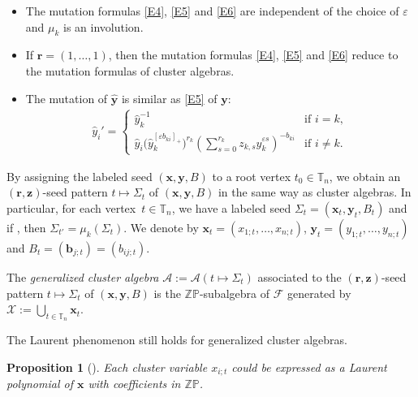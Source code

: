 \documentclass[pdftex]{sigma}
\newcommand{\Z}{\mathbb{Z}}
\numberwithin{equation}{section}
\newtheorem{Proposition}[Theorem]{Proposition}
 { \theoremstyle{definition}
\newtheorem{Definition}[Theorem]{Definition}
\newtheorem{Note}[Theorem]{Note}
\newtheorem{Example}[Theorem]{Example}
\newtheorem{Remark}[Theorem]{Remark} }
\begin{document}
\begin{Remark}\label{R1}\quad
\begin{itemize}\itemsep=0pt
\item[(1)] The mutation formulas \eqref{E4}, \eqref{E5} and \eqref{E6} are independent of the choice of $\varepsilon$ and $\mu_k$ is an involution.
 \item[(2)] If $\mathbf{r}=(1,\dots,1)$, then the mutation formulas \eqref{E4}, \eqref{E5} and \eqref{E6} reduce to the mutation formulas of cluster algebras.
 \item[(3)] The mutation of $\hat{\mathbf{y}}$ is similar as \eqref{E5} of $\mathbf{y}$:
 \begin{align*}
 \hat{y}_i'=
 \begin{cases}
 \hat{y}_k^{-1} & \text{if $i= k$}, \\
 \displaystyle \hat{y}_i\bigl(\hat{y}_k^{[\varepsilon b_{ki}]_+}\bigr)^{r_k}\left(\sum\limits_{s=0}^{r_k}z_{k,s}\hat{y}_k^{\varepsilon s}\right)^{-b_{ki}}& \text{if $i\neq k$}.
 \end{cases}
 \end{align*}
\end{itemize}
\end{Remark}

By assigning the labeled seed $(\mathbf{x},\mathbf{y}, B)$ to a root vertex $t_0\in \mathbb{T}_n$, we obtain an $(\mathbf{r},\mathbf{z})$-seed pattern $t\mapsto \Sigma_t$ of $(\mathbf{x},\mathbf{y}, B)$ in the same way as cluster algebras. In particular, for each vertex~${t\in \mathbb{T}_n}$, we have a labeled seed $\Sigma_t=(\mathbf{x}_t, \mathbf{y}_t, B_t)$ and if , then $\Sigma_{t'}=\mu_k(\Sigma_t)$. We denote by $\mathbf{x}_t=(x_{1;t},\dots, x_{n;t})$, $\mathbf{y}_t=(y_{1;t},\dots,y_{n;t})$ and $B_t=(\mathbf{b}_{j;t})=(b_{ij;t})$.
\begin{Definition}
 The {\it generalized cluster algebra} $\mathcal{A}:=\mathcal{A}(t\mapsto \Sigma_t)$ associated to the $(\mathbf{r},\mathbf{z})$-seed pattern $t\mapsto \Sigma_t$ of $(\mathbf{x},\mathbf{y}, B)$ is the $\Z \mathbb{P}$-subalgebra of $\mathcal{F}$ generated by
 $\mathcal{X}:=\bigcup_{t\in \mathbb{T}_n}\mathbf{x}_t$.
\end{Definition}
The Laurent phenomenon still holds for generalized cluster algebras.
\begin{Proposition}[{\cite[Theorem 2.5]{Chekhov_Shapiro}}]\label{P6}
 Each cluster variable $x_{i;t}$ could be expressed as a Laurent polynomial of $\mathbf{x}$ with coefficients in $\mathbb{Z}\mathbb{P}$.
\end{Proposition}
\end{document}
